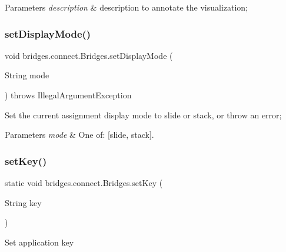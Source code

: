 \begin{DoxyParams}{Parameters}
{\em description} & description to annotate the visualization; \\
\hline
\end{DoxyParams}
\mbox{\label{classbridges_1_1connect_1_1_bridges_aaa1a44a689daa26a841d0e8d31839861}} 
\subsubsection{\texorpdfstring{set\+Display\+Mode()}{setDisplayMode()}}
{\footnotesize\ttfamily void bridges.\+connect.\+Bridges.\+set\+Display\+Mode (\begin{DoxyParamCaption}\item[{String}]{mode }\end{DoxyParamCaption}) throws Illegal\+Argument\+Exception}

Set the current assignment display mode to slide or stack, or throw an error; 
\begin{DoxyParams}{Parameters}
{\em mode} & One of\+: \mbox{[}\textquotesingle{}slide\textquotesingle{}, \textquotesingle{}stack\textquotesingle{}\mbox{]}. \\
\hline
\end{DoxyParams}
\mbox{\label{classbridges_1_1connect_1_1_bridges_ab69e89ec7d2e674a8b8c4b0be0c63397}} 
\subsubsection{\texorpdfstring{set\+Key()}{setKey()}}
{\footnotesize\ttfamily static void bridges.\+connect.\+Bridges.\+set\+Key (\begin{DoxyParamCaption}\item[{String}]{key }\end{DoxyParamCaption})\hspace{0.3cm}{\ttfamily [static]}}

Set application key


